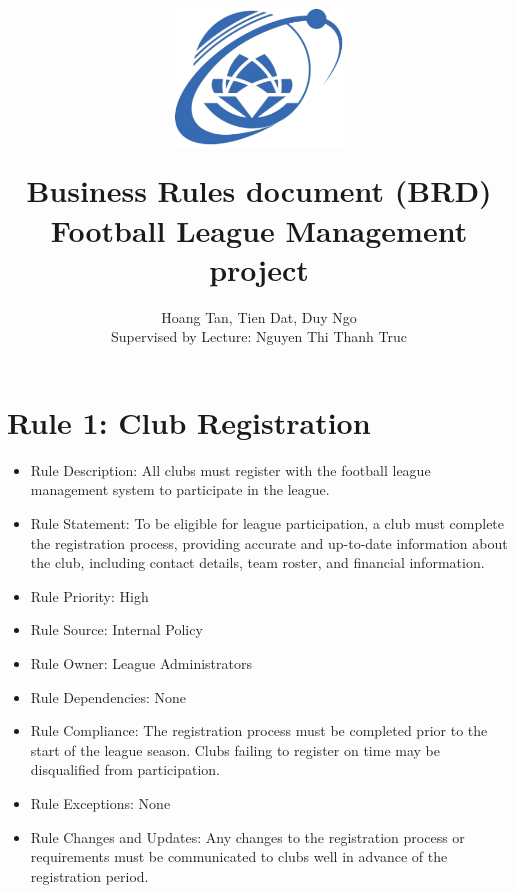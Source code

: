 \documentclass[12pt]{article}
\title{
{\includegraphics[width=4.5cm, height=4.5cm]{Figs/logo-uit-300x248.png}
}
\\
{Business Rules document (BRD) \\ Football League Management project}
}
\author{Hoang Tan, Tien Dat, Duy Ngo \\ Supervised by Lecture: Nguyen Thi Thanh Truc }
\begin{document}
\maketitle
\tableofcontents
\section{Rule 1: Club Registration}
\begin{itemize}
    \item Rule Description: All clubs must register with the football league management system to participate in the league.
    \item Rule Statement: To be eligible for league participation, a club must complete the registration process, providing accurate and up-to-date information about the club, including contact details, team roster, and financial information.
    \item Rule Priority: High
    \item Rule Source: Internal Policy
    \item Rule Owner: League Administrators
    \item Rule Dependencies: None
    \item Rule Compliance: The registration process must be completed prior to the start of the league season. Clubs failing to register on time may be disqualified from participation.
    \item Rule Exceptions: None
    \item Rule Changes and Updates: Any changes to the registration process or requirements must be communicated to clubs well in advance of the registration period.
\end{itemize}
\end{document}
